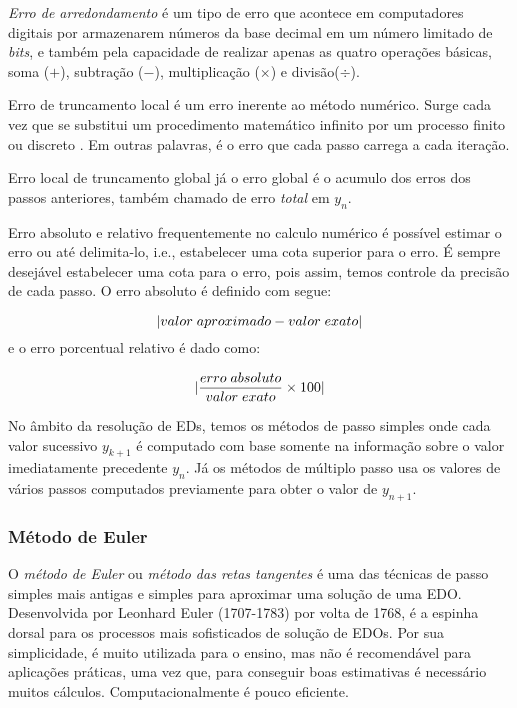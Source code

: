 \emph{Erro de arredondamento} é um tipo de erro que acontece em
computadores digitais por armazenarem números da base decimal em um número limitado
de \emph{bits}, e também pela capacidade de realizar apenas as quatro operações
básicas, soma ($+$), subtração ($-$), multiplicação ($\times$) e divisão($\div$).

Erro de truncamento local é um erro inerente ao método numérico. Surge
cada vez que se substitui um procedimento matemático infinito por um processo 
finito ou discreto \cite{sperandio2003calculo}. Em outras palavras, é o erro
que cada passo carrega a cada iteração.

Erro local de truncamento global já o erro global é o acumulo dos erros
dos passos anteriores, também chamado de erro \emph{total} em $y_{n}$.

Erro absoluto e relativo frequentemente no calculo numérico é possível
estimar o erro ou até delimita-lo, i.e., estabelecer uma cota superior para o erro.
É sempre desejável estabelecer uma cota para o erro, pois assim, temos controle
da precisão de cada passo. O erro absoluto é definido com segue:

\begin{equation*}
\lvert valor \thickspace aproximado - valor \thickspace exato\rvert
\end{equation*}
e o erro porcentual relativo é dado como:

\begin{equation*}
\lvert\frac{erro \thickspace absoluto}{valor \thickspace exato} \times 100\rvert
\end{equation*}

No âmbito da resolução de EDs, temos os métodos de passo simples onde cada valor
sucessivo $y_{k+1}$ é computado com base somente na informação sobre o valor 
imediatamente precedente $y_{n}$. Já os métodos de múltiplo passo usa os valores
de vários passos computados previamente para obter o valor de $y_{n+1}$.

\subsubsection{Método de Euler}

O \emph{método de Euler} ou \emph{método das retas tangentes}
é uma das técnicas de passo simples  mais antigas e simples para aproximar uma solução 
de uma EDO. Desenvolvida por Leonhard Euler (1707-1783) por volta de 1768, é 
a espinha dorsal para os processos mais sofisticados de solução de EDOs.
Por sua simplicidade, é muito utilizada para o ensino, mas não é recomendável
para aplicações práticas, uma vez que, para conseguir boas estimativas é necessário
muitos cálculos. Computacionalmente é pouco eficiente.


